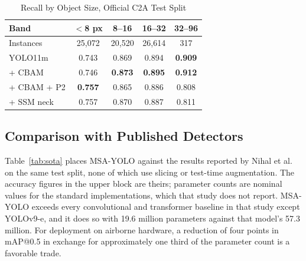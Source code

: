 \documentclass[conference,a4paper]{IEEEtran}
\begin{document}
\begin{table}[t]
\caption{Recall by Object Size, Official C2A Test Split}
\label{tab:size}
\begin{center}
\footnotesize
\setlength{\tabcolsep}{3pt}
\begin{tabular}{|l|c|c|c|c|}
\hline
\textbf{Band} & \textbf{$<$8 px} & \textbf{8--16} & \textbf{16--32} & \textbf{32--96} \\
\hline
Instances & 25{,}072 & 20{,}520 & 26{,}614 & 317 \\
\hline
YOLO11m & 0.743 & 0.869 & 0.894 & \textbf{0.909} \\
\hline
+ CBAM & 0.746 & \textbf{0.873} & \textbf{0.895} & \textbf{0.912} \\
\hline
+ CBAM + P2 & \textbf{0.757} & 0.865 & 0.886 & 0.808 \\
\hline
+ SSM neck & 0.757 & 0.870 & 0.887 & 0.811 \\
\hline
\end{tabular}
\end{center}
\end{table}

\subsection{Comparison with Published Detectors}
Table~\ref{tab:sota} places MSA-YOLO against the results reported by Nihal et
al.~\cite{nihal2024c2a} on the same test split, none of which use slicing or
test-time augmentation. The accuracy figures in the upper block are theirs;
parameter counts are nominal values for the standard implementations, which
that study does not report. MSA-YOLO exceeds every convolutional and transformer
baseline in that study except YOLOv9-e, and it does so with 19.6 million
parameters against that model's 57.3 million. For deployment on airborne
hardware, a reduction of four points in mAP@0.5 in exchange for approximately one
third of the parameter count is a favorable trade.
\end{document}
